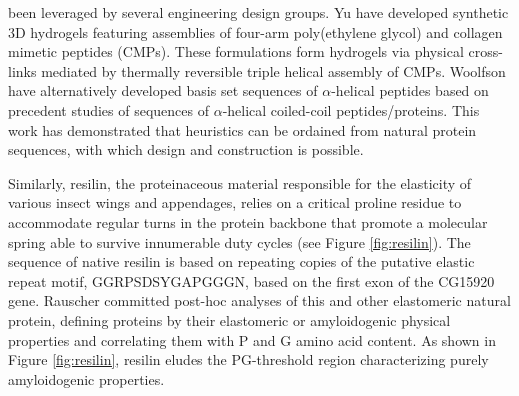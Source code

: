 \begin{refsection}
been leveraged by several engineering design
groups.\cite{Kar2009,Stahl2010a,Fletcher2012} Yu  have developed
synthetic 3D hydrogels featuring assemblies of four-arm poly(ethylene glycol)
and collagen mimetic peptides (CMPs).\cite{Stahl2010a} These formulations form
hydrogels via physical cross-links mediated by thermally reversible triple
helical assembly of CMPs. Woolfson  have alternatively developed
 basis set sequences of ${\alpha}$-helical peptides based on precedent
studies of sequences of ${\alpha}$-helical coiled-coil
peptides/proteins.\cite{Fletcher2012} This work has demonstrated that heuristics
can be ordained from natural protein sequences, with which 
design and construction is possible.

Similarly, resilin, the proteinaceous material responsible for the elasticity of
various insect wings and appendages, relies on a critical proline residue to
accommodate regular turns in the protein backbone that promote a molecular
spring able to survive innumerable duty cycles (see Figure
\ref{fig:resilin}).\cite{Rauscher2006} The sequence of native resilin is based
on repeating copies of the putative elastic repeat motif,
GGRPSDSYGAPGGGN, based on the first exon of the
 CG15920 gene.\cite{Ardell2001} Rauscher committed post-hoc
analyses of this and other elastomeric natural protein, defining proteins by
their elastomeric or amyloidogenic physical properties and correlating them with
P and G amino acid content.\cite{Rauscher2006} As shown in Figure
\ref{fig:resilin}, resilin eludes the PG-threshold region characterizing
purely amyloidogenic properties.


\end{refsection}
